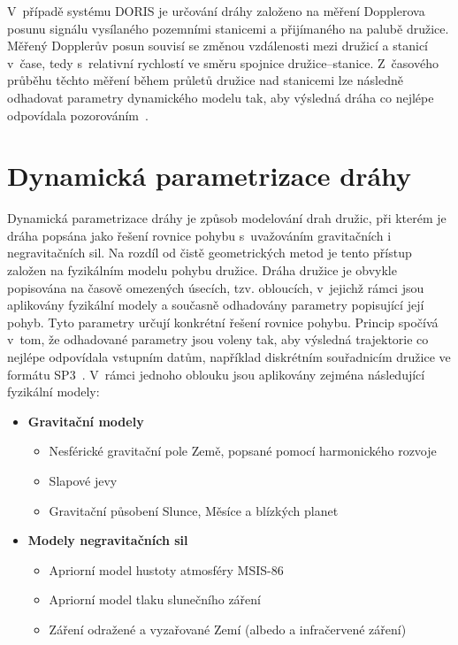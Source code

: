 V~případě systému DORIS je určování dráhy založeno na měření Dopplerova posunu signálu vysílaného pozemními stanicemi a přijímaného na palubě družice. Měřený Dopplerův posun souvisí se změnou vzdálenosti mezi družicí a stanicí v~čase, tedy s~relativní rychlostí ve směru spojnice družice--stanice. Z~časového průběhu těchto měření během průletů družice nad stanicemi lze následně odhadovat parametry  dynamického modelu tak, aby výsledná dráha co nejlépe odpovídala pozorováním~\cite{ids_what_is_doris}.

\section{Dynamická parametrizace dráhy}

Dynamická parametrizace dráhy je způsob modelování drah družic, při kterém je dráha popsána jako řešení rovnice pohybu s~uvažováním gravitačních i negravitačních sil. Na rozdíl od čistě geometrických metod je tento přístup založen na fyzikálním modelu pohybu družice. Dráha družice je obvykle popisována na časově omezených úsecích, tzv. obloucích, v~jejichž rámci jsou aplikovány fyzikální modely a současně odhadovány parametry popisující její pohyb. Tyto parametry určují konkrétní řešení rovnice pohybu. Princip spočívá v~tom, že odhadované parametry jsou voleny tak, aby výsledná trajektorie co nejlépe odpovídala vstupním datům, například diskrétním souřadnicím družice ve formátu SP3~\cite{bernese_5_2}. V~rámci jednoho oblouku jsou aplikovány zejména následující fyzikální modely:

\begin{itemize}

\item \textbf{Gravitační modely}
\begin{itemize}
\item Nesférické gravitační pole Země, popsané pomocí harmonického rozvoje
\item Slapové jevy
\item Gravitační působení Slunce, Měsíce a blízkých planet
\end{itemize}

\item \textbf{Modely negravitačních sil}
\begin{itemize}
\item Apriorní model hustoty atmosféry MSIS-86
\item Apriorní model tlaku slunečního záření
\item Záření odražené a vyzařované Zemí (albedo a infračervené záření)
\end{itemize}

\end{itemize}

